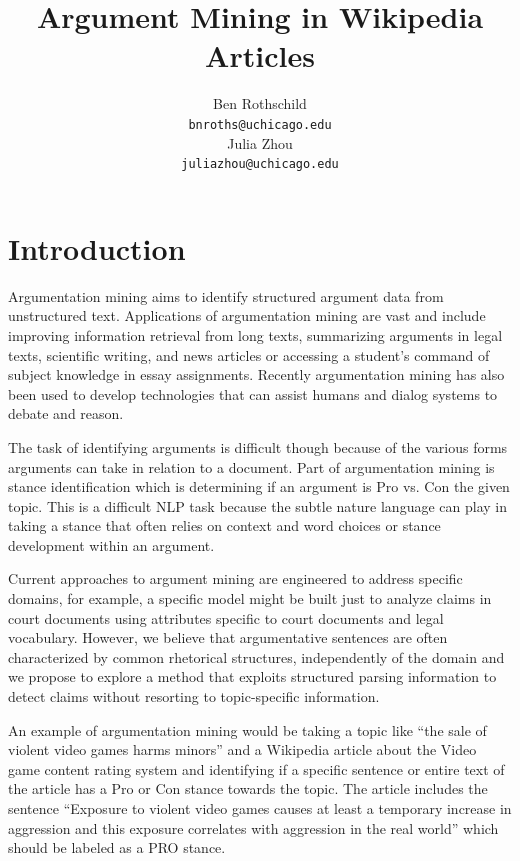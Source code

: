 \documentclass[11pt,a4paper]{article}
\title{Argument Mining in Wikipedia Articles}
\author{Ben Rothschild \\
  {\tt bnroths@uchicago.edu} \\\And
  Julia Zhou \\
  {\tt juliazhou@uchicago.edu} \\}
\date{}
\begin{document}
\maketitle
\begin{abstract}
  
\end{abstract}

\section{Introduction}
Argumentation mining aims to identify structured argument data from unstructured text.  Applications of argumentation mining are vast and include improving information retrieval from long texts, summarizing arguments in legal texts, scientific writing, and news articles or accessing a student's command of subject knowledge in essay assignments.  Recently argumentation mining has also been used to develop technologies that can assist humans and dialog systems to debate and reason.  

The task of identifying arguments is difficult though because of the various forms arguments can take in relation to a document.  Part of argumentation mining is stance identification which is determining if an argument is Pro vs. Con the given topic.  This is a difficult NLP task because the subtle nature language can play in taking a stance that often relies on context and word choices or stance development within an argument.  

Current approaches to argument mining are engineered to address specific domains, for example, a specific model might be built just to analyze claims in court documents using attributes specific to court documents and legal vocabulary.  However, we believe that argumentative sentences are often characterized by common rhetorical structures, independently of the domain and we propose to explore a method that exploits structured parsing information to detect claims without resorting to topic-specific information. 

An example of argumentation mining would be taking a topic like “the sale of violent video games harms minors” and a Wikipedia article about the ​Video game content rating system​ and identifying if a specific sentence or entire text of the article has a Pro or Con stance towards the topic. The article includes the sentence “Exposure to violent video games causes at least a temporary increase in aggression and this exposure correlates with aggression in the real world” which should be labeled as a PRO stance.
\end{document}
